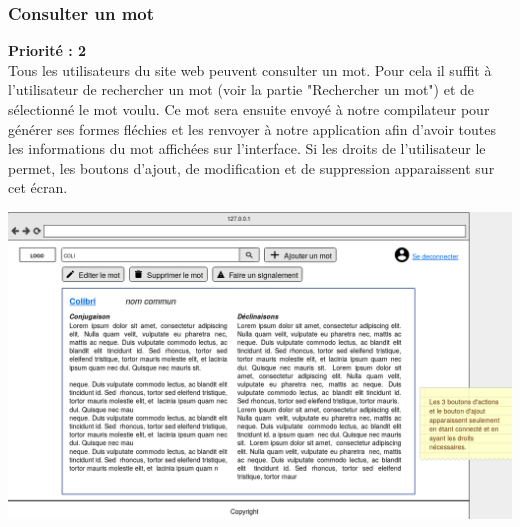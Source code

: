 \documentclass[12pt,a4paper]{article}
\begin{document}
\subsubsection{Consulter un mot}
 \textbf{Priorité : 2}
\\ Tous les utilisateurs du site web peuvent consulter un mot. Pour cela il suffit à l'utilisateur de rechercher un mot (voir la partie "Rechercher un mot") et de sélectionné le mot voulu. Ce mot sera ensuite envoyé à notre compilateur pour générer ses formes fléchies et les renvoyer à notre application afin d'avoir toutes les informations du mot affichées sur l'interface.
Si les droits de l'utilisateur le permet, les boutons d'ajout, de modification et de suppression apparaissent sur cet écran.
\begin{center}\includegraphics[width=150mm]{img/consult_screen.png}\end{center}
\end{document}
